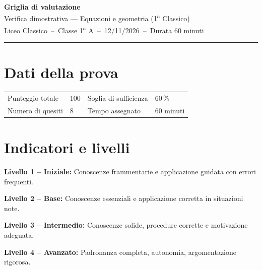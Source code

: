 \documentclass[11pt,a4paper]{article}
\begin{document}
\begin{center}
  {\Large\bfseries Griglia di valutazione}\\[2mm]
  {\large Verifica dimostrativa --- Equazioni e geometria (1\textsuperscript{a} Classico)}\\[1.5mm]
  {\small Liceo Classico\ --\ Classe 1\textsuperscript{a} A\ --\ 12/11/2026\ --\ Durata 60 minuti}
\end{center}
\vspace{1mm}
\noindent\rule{\linewidth}{0.4pt}

\section*{Dati della prova}
\begin{center}
\begin{tabular}{@{}llll@{}}
\toprule
Punteggio totale & 100 & Soglia di sufficienza & 60\,\% \\
Numero di quesiti & 8 & Tempo assegnato & 60 minuti \\
\bottomrule
\end{tabular}
\end{center}

\section*{Indicatori e livelli}

\noindent\textbf{Livello 1 -- Iniziale:} \small Conoscenze frammentarie e applicazione guidata con errori frequenti.\normalsize\par\vspace{1mm}

\noindent\textbf{Livello 2 -- Base:} \small Conoscenze essenziali e applicazione corretta in situazioni note.\normalsize\par\vspace{1mm}

\noindent\textbf{Livello 3 -- Intermedio:} \small Conoscenze solide, procedure corrette e motivazione adeguata.\normalsize\par\vspace{1mm}

\noindent\textbf{Livello 4 -- Avanzato:} \small Padronanza completa, autonomia, argomentazione rigorosa.\normalsize\par\vspace{1mm}
\end{document}
